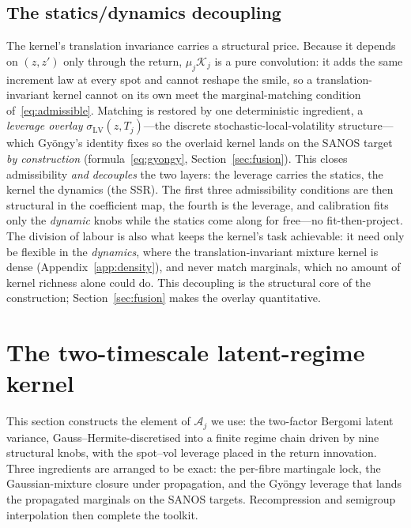 \documentclass[11pt]{article}
\newcommand{\cK}{\mathcal{K}}
\newcommand{\cA}{\mathcal{A}}
\begin{document}
\subsection{The statics/dynamics decoupling}
\label{sec:decouple}
The kernel's translation invariance carries a structural price. Because it
depends on $(z,z')$ only through the return, $\mu_j\cK_j$ is a pure convolution: it adds the same
increment law at every spot and cannot reshape the smile, so a translation-invariant kernel cannot
on its own meet the marginal-matching condition of~\eqref{eq:admissible}. Matching is restored by one
deterministic ingredient, a \emph{leverage overlay} $\sigma_{\mathrm{LV}}(z,T_j)$---the discrete
stochastic-local-volatility structure---which Gy\"ongy's identity fixes so the overlaid kernel lands
on the SANOS target \emph{by construction} (formula~\eqref{eq:gyongy}, Section~\ref{sec:fusion}). This
closes admissibility \emph{and} \emph{decouples} the two layers: the leverage carries the statics, the
kernel the dynamics (the SSR). The first three admissibility conditions are then structural in the
coefficient map, the fourth is the leverage, and calibration fits only the \emph{dynamic} knobs while
the statics come along for free---no fit-then-project. The division of labour is also what keeps the
kernel's task achievable: it need only be flexible in the \emph{dynamics}, where the translation-invariant
mixture kernel is dense (Appendix~\ref{app:density}), and never match marginals, which no amount of kernel
richness alone could do. This decoupling is the structural core of the
construction; Section~\ref{sec:fusion} makes the overlay quantitative.

\section{The two-timescale latent-regime kernel}
\label{sec:twoscale}

This section constructs the element of $\cA_j$ we use: the two-factor Bergomi latent
variance, Gauss--Hermite-discretised into a finite regime chain driven by nine structural
knobs, with the spot--vol leverage placed in the return innovation. Three ingredients are
arranged to be exact: the per-fibre martingale lock, the Gaussian-mixture closure under
propagation, and the Gy\"ongy leverage that lands the propagated marginals on the SANOS
targets. Recompression and semigroup interpolation then complete the toolkit.
\end{document}
